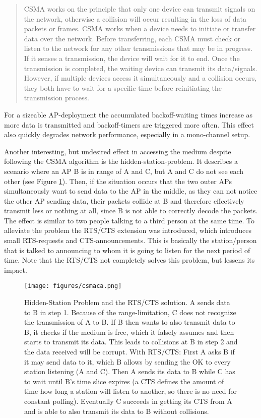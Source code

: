 	\begin{quotation}
	  CSMA works on the principle that only one device can transmit signals on the network, 
	  otherwise a collision will occur resulting in the loss of data packets or frames. 
	  CSMA works when a device needs to initiate or transfer data over the network. 
	  Before transferring, each CSMA must check or listen to the network for any other transmissions that may be in progress. 
	  If it senses a transmission, the device will wait for it to end. Once the transmission is completed, 
	  the waiting device can transmit its data/signals. However, if multiple devices access it simultaneously and a collision occurs, 
	  they both have to wait for a specific time before reinitiating the transmission process. 
	\end{quotation}
	
	For a sizeable \ac{AP}-deployment the accumulated backoff-waiting times increase as more data is transmitted and backoff-timers are triggered more often.
	This effect also quickly degrades network performance, especially in a mono-channel setup.
	
	Another interesting, but undesired effect in accessing the medium despite following the CSMA algorithm is the hidden-station-problem.
	It describes a scenario where an \ac{AP} B is in range of A and C, but A and C do not see each other (see Figure \ref{fig:csmaca}).
	Then, if the situation occurs that the two outer APs simultaneously want to send data to the \ac{AP} in the middle, as they can not notice the 
	other AP sending data, their packets collide at B and therefore effectively transmit less or nothing at all, since B is not able to correctly decode the packets.
	The effect is similar to two people talking to a third person at the same time.
	To alleviate the problem the RTS/CTS extension was introduced, which introduces small \ac{RTS}-requests and \ac{CTS}-announcements. 
	This is basically the station/person that is talked to announcing to whom it is going to listen for the next period of time.
	Note that the RTS/CTS not completely solves this problem, but lessens its impact.
	
	\begin{figure}[th!]
	  \centering
	  \texttt{[image: figures/csmaca.png]}
	  \caption{Hidden-Station Problem and the RTS/CTS solution. A sends data to B in step 1.
	    Because of the range-limitation, C does not recognize the transmission of A to B. 
	    If B then wants to also transmit data to B, it checks if the medium is free, which it falsely assumes
	    and then starts to transmit its data. This leads to collisions at B in step 2 and the data received will be corrupt.
	    With RTS/CTS: First A asks B if it may send data to it, which B allows by sending the OK to every station listening (A and C). 
	    Then A sends its data to B while C has to wait until B's time slice expires (a CTS defines the amount of time how long a station will listen to another, so there is no
	    need for constant polling). Eventually C succeeds in getting its CTS from A and is able to also transmit its data to B without collisions.}
	  \label{fig:csmaca}
	\end{figure}

